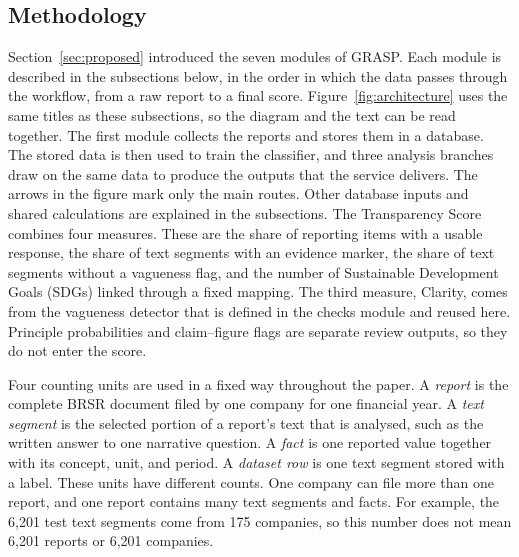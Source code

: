  
\begin{lrbox}{\methodologyoverviewbox}
\begin{minipage}{\linewidth}
\section{Methodology}
\label{sec:methodology}

Section~\ref{sec:proposed} introduced the seven modules of GRASP. Each module is described in the subsections below, in the order in which the data passes through the workflow, from a raw report to a final score. Figure~\ref{fig:architecture} uses the same titles as these subsections, so the diagram and the text can be read together. The first module collects the reports and stores them in a database. The stored data is then used to train the classifier, and three analysis branches draw on the same data to produce the outputs that the service delivers. The arrows in the figure mark only the main routes. Other database inputs and shared calculations are explained in the subsections. The Transparency Score combines four measures. These are the share of reporting items with a usable response, the share of text segments with an evidence marker, the share of text segments without a vagueness flag, and the number of Sustainable Development Goals (SDGs) linked through a fixed mapping. The third measure, Clarity, comes from the vagueness detector that is defined in the checks module and reused here. Principle probabilities and claim--figure flags are separate review outputs, so they do not enter the score.


\end{minipage}
\end{lrbox}
\ifdim\dimexpr\ht\methodologyoverviewbox+\dp\methodologyoverviewbox\relax>\textheight
\PackageError{GRASP-layout}{Methodology overview exceeds one page}{Reduce the diagram height.}
\fi
\noindent\usebox{\methodologyoverviewbox}
\par\clearpage

Four counting units are used in a fixed way throughout the paper. A \emph{report} is the complete BRSR document filed by one company for one financial year. A \emph{text segment} is the selected portion of a report's text that is analysed, such as the written answer to one narrative question. A \emph{fact} is one reported value together with its concept, unit, and period. A \emph{dataset row} is one text segment stored with a label. These units have different counts. One company can file more than one report, and one report contains many text segments and facts. For example, the 6,201 test text segments come from 175 companies, so this number does not mean 6,201 reports or 6,201 companies.

